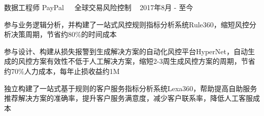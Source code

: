 \documentclass[11pt, a4paper, UTF8]{awesome-cv}
\begin{document}
%
\begin{cventries}
  \cventry
    {数据工程师} %
    {PayPal{\ \cdotp\ \ }全球交易风险控制} %
    {\ } %
    {2017年8月 - 至今} %
    {
      \begin{cvitems} %
        \item {参与业务逻辑分析，并构建了一站式风控规则指标分析系统Rule360，缩短风控分析决策周期，节省约80\%的时间成本}
        \item {参与设计、构建从损失报警到生成解决方案的自动化风控平台HyperNet，自动生成的风控方案有效性不低于人工解决方案，缩短2-3周生成风控方案的周期，节省约70\%人力成本，每年止损收益约1M}
        \item {独立构建了一站式基于规则的客户服务指标分析系统Lexa360，帮助提高自助服务推荐解决方案的准确率，提升客户服务满意度，减少客户联系率，降低人工客服成本}
      \end{cvitems}
    }
    

\end{cventries}
\end{document}
